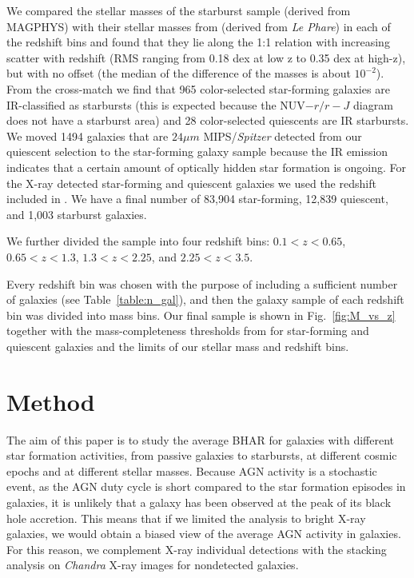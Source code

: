 We compared the stellar masses of the starburst sample (derived from MAGPHYS) with their stellar masses from \citet{2016ApJS..224...24L} (derived from \emph{Le Phare}) in each of the redshift bins and found that they lie along the 1:1 relation with increasing scatter with redshift (RMS ranging from 0.18 dex at low z to 0.35 dex at high-z), but with no offset (the median of the difference of the masses is about $10^{-2}$). From the cross-match we find that 965 color-selected star-forming galaxies are IR-classified as starbursts (this is expected because the NUV$ - r / r - J$ diagram does not have a starburst area) and 28 color-selected quiescents are IR starbursts. We moved 1494 galaxies that are $24\mu m$ MIPS/\textit{Spitzer} detected from our quiescent selection to the star-forming galaxy sample because the IR emission indicates that a certain amount of optically hidden star formation is ongoing. For the X-ray detected star-forming and quiescent galaxies we used the redshift included in \citet{2016ApJ...817...34M}. We have a final number of 83,904 star-forming, 12,839 quiescent, and 1,003 starburst galaxies.

We further divided the sample into four redshift bins: $0.1<z<0.65$, $0.65<z<1.3$, $1.3<z<2.25$, and $2.25<z<3.5$.

Every redshift bin was chosen with the purpose of including a sufficient number of galaxies (see Table~\ref{table:n_gal}), and then the galaxy sample of each redshift bin was divided into mass bins. Our final sample is shown in Fig.~\ref{fig:M_vs_z} together with the mass-completeness thresholds from \citet{2016ApJS..224...24L} for star-forming and quiescent galaxies and the limits of our stellar mass and redshift bins. 

\section{Method} \label{sec:method}
The aim of this paper is to study the average BHAR for galaxies with different star formation activities, from passive galaxies to starbursts, at different cosmic epochs and at different stellar masses. Because AGN activity is a stochastic event, as the AGN duty cycle is short compared to the star formation episodes in galaxies, it is unlikely that a galaxy has been observed at the peak of its black hole accretion. This means that if we limited the analysis to bright X-ray galaxies, we would obtain a biased view of the average AGN activity in
galaxies. For this reason, we complement X-ray individual detections with the stacking analysis on \textit{Chandra} X-ray images for nondetected galaxies. 

